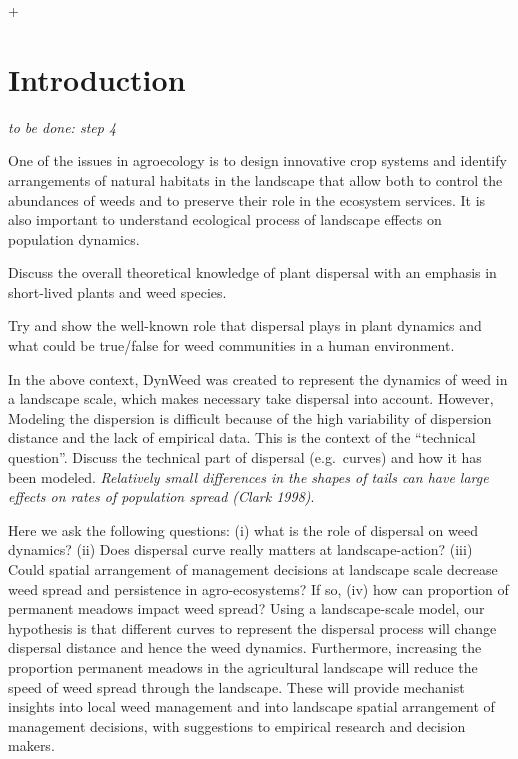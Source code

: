 +\documentclass[12pt]{article}
\begin{document}

\section{Introduction}\label{introduction}

\emph{to be done: step 4}

One of the issues in agroecology is to design innovative crop systems
and identify arrangements of natural habitats in the landscape that
allow both to control the abundances of weeds and to preserve their role
in the ecosystem services. It is also important to understand ecological
process of landscape effects on population dynamics.

Discuss the overall theoretical knowledge of plant dispersal with an
emphasis in short-lived plants and weed species.

Try and show the well-known role that dispersal plays in plant dynamics
and what could be true/false for weed communities in a human
environment.

In the above context, DynWeed was created to represent the dynamics of
weed in a landscape scale, which makes necessary take dispersal into
account. However, Modeling the dispersion is difficult because of the
high variability of dispersion distance and the lack of empirical data.
This is the context of the \enquote{technical question}. Discuss the
technical part of dispersal (e.g.~curves) and how it has been modeled.
\emph{Relatively small differences in the shapes of tails can have large
effects on rates of population spread (Clark 1998)}.

Here we ask the following questions: (i) what is the role of dispersal
on weed dynamics? (ii) Does dispersal curve really matters at
landscape-action? (iii) Could spatial arrangement of management
decisions at landscape scale decrease weed spread and persistence in
agro-ecosystems? If so, (iv) how can proportion of permanent meadows
impact weed spread? Using a landscape-scale model, our hypothesis is
that different curves to represent the dispersal process will change
dispersal distance and hence the weed dynamics. Furthermore, increasing
the proportion permanent meadows in the agricultural landscape will
reduce the speed of weed spread through the landscape. These will
provide mechanist insights into local weed management and into landscape
spatial arrangement of management decisions, with suggestions to
empirical research and decision makers.
\end{document}
